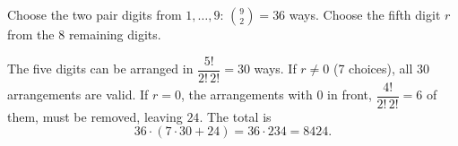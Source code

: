 Choose the two pair digits from $1,\dots,9$: $\binom{9}{2}=36$ ways. Choose the fifth digit $r$ from the $8$ remaining digits.

The five digits can be arranged in $\dfrac{5!}{2!\,2!}=30$ ways. If $r\neq0$ (7 choices), all $30$ arrangements are valid. If $r=0$, the arrangements with $0$ in front, $\dfrac{4!}{2!\,2!}=6$ of them, must be removed, leaving $24$. The total is
\[
36\cdot\left(7\cdot30+24\right)=36\cdot234=\boxed{8424}.
\]
